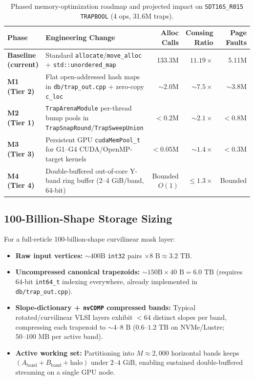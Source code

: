 \begin{table}[htbp]
\centering
\caption{Phased memory-optimization roadmap and projected impact on \texttt{SDT16S\_R015} \texttt{TRAPBOOL} (4 ops, 31.6M traps).}
\label{tab:consing_roadmap}
\small
\begin{tabular}{@{}p{2.3cm}p{5.0cm}rrr@{}}
\toprule
\textbf{Phase} & \textbf{Engineering Change} & \textbf{Alloc Calls} & \textbf{Consing Ratio} & \textbf{Page Faults} \\
\midrule
\textbf{Baseline (current)} & Standard \texttt{allocate}/\texttt{move\_alloc} + \texttt{std::unordered\_map} & 133.3M & $11.19\times$ & 5.11M \\
\textbf{M1 (Tier 2)} & Flat open-addressed hash maps in \texttt{db/trap\_out.cpp} + zero-copy \texttt{c\_loc} & $\sim 2.0\text{M}$ & $\sim 7.5\times$ & $\sim 3.8\text{M}$ \\
\textbf{M2 (Tier 1)} & \texttt{TrapArenaModule} per-thread bump pools in \texttt{TrapSnapRound}/\texttt{TrapSweepUnion} & $< 0.2\text{M}$ & $\sim 2.1\times$ & $< 0.8\text{M}$ \\
\textbf{M3 (Tier 3)} & Persistent GPU \texttt{cudaMemPool\_t} for G1--G4 CUDA/OpenMP-target kernels & $< 0.05\text{M}$ & $\sim 1.4\times$ & $< 0.3\text{M}$ \\
\textbf{M4 (Tier 4)} & Double-buffered out-of-core Y-band ring buffer (2--4 GiB/band, 64-bit) & Bounded $O(1)$ & $\le 1.3\times$ & Bounded \\
\bottomrule
\end{tabular}
\end{table}

\subsection{100-Billion-Shape Storage Sizing}

For a full-reticle 100-billion-shape curvilinear mask layer:
\begin{itemize}
  \item \textbf{Raw input vertices:} $\sim 400\text{B}$ \texttt{int32} pairs $\times 8\text{ B} \approx 3.2\text{ TB}$.
  \item \textbf{Uncompressed canonical trapezoids:} $\sim 150\text{B} \times 40\text{ B} = 6.0\text{ TB}$ (requires 64-bit \texttt{int64\_t} indexing everywhere, already implemented in \texttt{db/trap\_out.cpp}).
  \item \textbf{Slope-dictionary + \texttt{nvCOMP} compressed bands:} Typical rotated/curvilinear VLSI layers exhibit $< 64$ distinct slopes per band, compressing each trapezoid to $\sim 4\text{--}8\text{ B}$ ($0.6\text{--}1.2\text{ TB}$ on NVMe/Lustre; $50\text{--}100\text{ MB}$ per active band).
  \item \textbf{Active working set:} Partitioning into $M \approx 2{,}000$ horizontal bands keeps $(A_{\text{band}} + B_{\text{band}} + \text{halo})$ under $2\text{--}4\text{ GiB}$, enabling sustained double-buffered streaming on a single GPU node.
\end{itemize}
